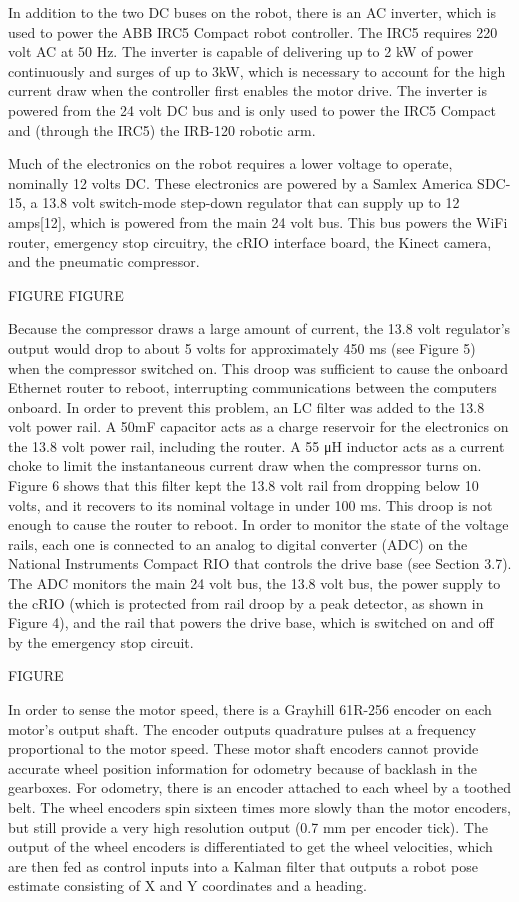 \documentclass[]{cwru} %
\begin{document}
In addition to the two DC buses on the robot, there is an AC inverter,
which is used to power the ABB IRC5 Compact robot controller. The IRC5
requires 220 volt AC at 50 Hz. The inverter is capable of delivering up
to 2 kW of power continuously and surges of up to 3kW, which is
necessary to account for the high current draw when the controller first
enables the motor drive. The inverter is powered from the 24 volt DC bus
and is only used to power the IRC5 Compact and (through the IRC5) the
IRB-120 robotic arm.

Much of the electronics on the robot requires a lower voltage to
operate, nominally 12 volts DC. These electronics are powered by a
Samlex America SDC-15, a 13.8 volt switch-mode step-down regulator that
can supply up to 12 amps{[}12{]}, which is powered from the main 24 volt
bus. This bus powers the WiFi router, emergency stop circuitry, the cRIO
interface board, the Kinect camera, and the pneumatic compressor.

FIGURE FIGURE

Because the compressor draws a large amount of current, the 13.8 volt
regulator's output would drop to about 5 volts for approximately 450 ms
(see Figure 5) when the compressor switched on. This droop was
sufficient to cause the onboard Ethernet router to reboot, interrupting
communications between the computers onboard. In order to prevent this
problem, an LC filter was added to the 13.8 volt power rail. A 50mF
capacitor acts as a charge reservoir for the electronics on the 13.8
volt power rail, including the router. A 55 μH inductor acts as a
current choke to limit the instantaneous current draw when the
compressor turns on. Figure 6 shows that this filter kept the 13.8 volt
rail from dropping below 10 volts, and it recovers to its nominal
voltage in under 100 ms. This droop is not enough to cause the router to
reboot. In order to monitor the state of the voltage rails, each one is
connected to an analog to digital converter (ADC) on the National
Instruments Compact RIO that controls the drive base (see Section 3.7).
The ADC monitors the main 24 volt bus, the 13.8 volt bus, the power
supply to the cRIO (which is protected from rail droop by a peak
detector, as shown in Figure 4), and the rail that powers the drive
base, which is switched on and off by the emergency stop circuit.

FIGURE

In order to sense the motor speed, there is a Grayhill 61R-256 encoder
on each motor's output shaft. The encoder outputs quadrature pulses at a
frequency proportional to the motor speed. These motor shaft encoders
cannot provide accurate wheel position information for odometry because
of backlash in the gearboxes. For odometry, there is an encoder attached
to each wheel by a toothed belt. The wheel encoders spin sixteen times
more slowly than the motor encoders, but still provide a very high
resolution output (0.7 mm per encoder tick). The output of the wheel
encoders is differentiated to get the wheel velocities, which are then
fed as control inputs into a Kalman filter that outputs a robot pose
estimate consisting of X and Y coordinates and a heading.
\end{document}
